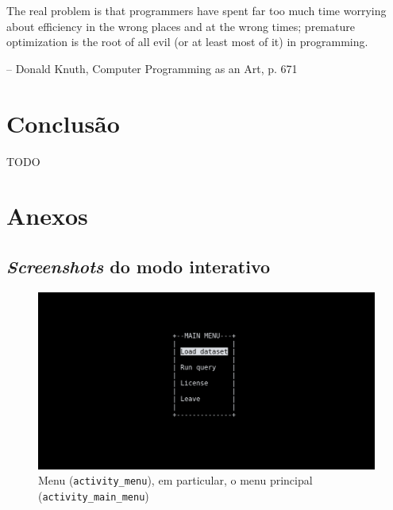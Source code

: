 \documentclass[11pt, a4paper]{article}
\begin{document}
\hspace{1cm}\parbox{15cm}{\small
    The real problem is that programmers have spent far too much time worrying about efficiency in
    the wrong places and at the wrong times; premature optimization is the root of all evil (or at
    least most of it) in programming.

    \begin{flushright}
        -- Donald Knuth, Computer Programming as an Art, p. 671
    \end{flushright}
}

\section{Conclusão}
\label{sec:conclusion}

{\color{red} TODO}

\pagebreak
\section{Anexos}
\label{sec:annexes}

\subsection{\emph{Screenshots} do modo interativo}
\label{sec:interactive-screenshots}

\begin{figure}[H]
    \centering
    \includegraphics[scale=0.25]{res-fase2/interactive_screenshots/main_menu.png}
    \caption{Menu (\texttt{activity\_menu}), em particular, o menu principal
             (\texttt{activity\_main\_menu})}
    \label{fig:main_menu}
\end{figure}
\end{document}
